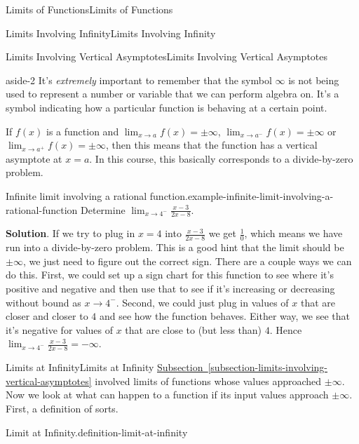 \documentclass[10pt,]{book}
\numberwithin{equation}{section}
\begin{document}
\begin{chapterptx}{Limits of Functions}{}{Limits of Functions}{}{}
\begin{sectionptx}{Limits Involving Infinity}{}{Limits Involving Infinity}{}{}
\begin{subsectionptx}{Limits Involving Vertical Asymptotes}{}{Limits Involving Vertical Asymptotes}{}{}
\begin{aside}{}{aside-2}%
\hypertarget{p-55}{}%
It's \emph{extremely} important to remember that the symbol \(\infty\) is not being used to represent a number or variable that we can perform algebra on. It's a symbol indicating how a particular function is behaving at a certain point.%
\end{aside}
\hypertarget{p-56}{}%
If \(f(x)\) is a function and \(\lim_{x\to a}f(x)=\pm\infty\), \(\lim_{x\to a^{-}}f(x)=\pm\infty\) or \(\lim_{x\to a^{+}}f(x)=\pm\infty\), then this means that the function has a vertical asymptote at \(x=a\). In this course, this basically corresponds to a divide-by-zero problem.%
\begin{example}{Infinite limit involving a rational function.}{example-infinite-limit-involving-a-rational-function}%
\hypertarget{p-57}{}%
Determine \(\lim_{x\to4^{-}}\frac{x-3}{2x-8}\).%
\par\smallskip%
\noindent\textbf{Solution}.\hypertarget{solution-11}{}\quad%
\hypertarget{p-58}{}%
If we try to plug in \(x=4\) into \(\frac{x-3}{2x-8}\) we get \(\frac{1}{0}\), which means we have run into a divide-by-zero problem. This is a good hint that the limit should be \(\pm\infty\), we just need to figure out the correct sign. There are a couple ways we can do this. First, we could set up a sign chart for this function to see where it's positive and negative and then use that to see if it's increasing or decreasing without bound as \(x\to4^{-}\). Second, we could just plug in values of \(x\) that are closer and closer to \(4\) and see how the function behaves. Either way, we see that it's negative for values of \(x\) that are close to (but less than) \(4\). Hence \(\lim_{x\to4^{-}}\frac{x-3}{2x-8}=-\infty\).%
\end{example}
\end{subsectionptx}
%
%
\typeout{************************************************}
\typeout{************************************************}
%
\begin{subsectionptx}{Limits at Infinity}{}{Limits at Infinity}{}{}\label{subsection-limits-at-infinity}
\hypertarget{p-59}{}%
\hyperref[subsection-limits-involving-vertical-asymptotes]{Subsection~\ref{subsection-limits-involving-vertical-asymptotes}} involved limits of functions whose values approached \(\pm\infty\). Now we look at what can happen to a function if its input values approach \(\pm\infty\). First, a definition of sorts.%
\begin{definition}{Limit at Infinity.}{definition-limit-at-infinity}%

\end{definition}
\end{subsectionptx}
\end{sectionptx}
\end{chapterptx}
\end{document}

